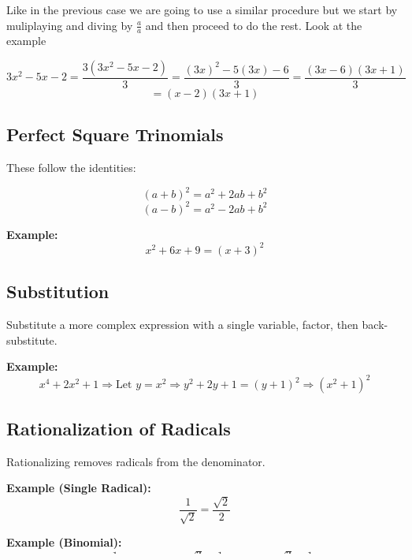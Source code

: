 Like in the previous case we are going to use a similar procedure but we start by
muliplaying and diving by \(\frac{a}{a}\) and then proceed to do the rest. Look at the example

\[
3x^2 -5x - 2 = \frac{3(3x^2 -5x - 2)}{3} = \frac{(3x)^2 -5(3x) - 6}{3} = \frac{(3x- 6)(3x+1)}{3} 
\]
\[
= (x- 2)(3x +1)
\]

\subsection{Perfect Square Trinomials}

These follow the identities:

\[
(a + b)^2 = a^2 + 2ab + b^2
\]
\[
(a - b)^2 = a^2 - 2ab + b^2
\]

\textbf{Example:}
\[
x^2 + 6x + 9 = (x + 3)^2
\]

\subsection{Substitution}

Substitute a more complex expression with a single variable, factor, then back-substitute.

\textbf{Example:}
\[
x^4 + 2x^2 + 1 \Rightarrow \text{Let } y = x^2 \Rightarrow y^2 + 2y + 1 = (y + 1)^2 \Rightarrow (x^2 + 1)^2
\]

\subsection{Rationalization of Radicals}

Rationalizing removes radicals from the denominator.

\textbf{Example (Single Radical):}
\[
\frac{1}{\sqrt{2}} = \frac{\sqrt{2}}{2}
\]

\textbf{Example (Binomial):}
\[
\frac{1}{\sqrt{3} + 1} = \frac{\sqrt{3} - 1}{(\sqrt{3} + 1)(\sqrt{3} - 1)} = \frac{\sqrt{3} - 1}{2}
\]

\subsection{Ruffini’s Rule (Horner’s Method)}

Used to divide a polynomial by a binomial of the form \((x - r)\).

\textbf{Steps:}
\begin{enumerate}
    \item Write coefficients of the polynomial.
    \item Bring down the first coefficient.
    \item Multiply it by \(r\), add to next coefficient.
    \item Repeat until the remainder.
\end{enumerate}

